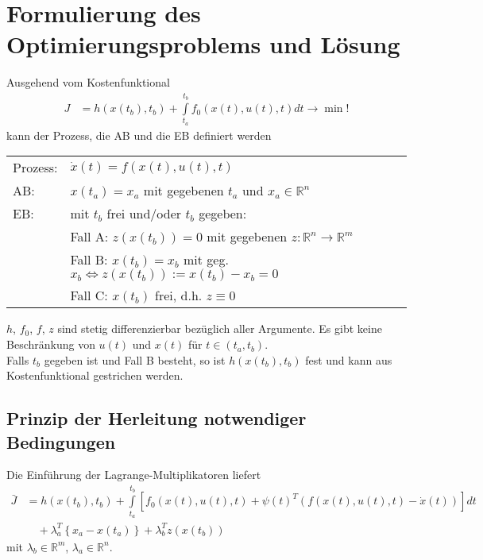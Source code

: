 \section{Formulierung des Optimierungsproblems und Lösung}
Ausgehend vom Kostenfunktional
\begin{align*}
	J & = h\left(x(t_b),t_b \right) + \int\limits_{t_a}^{t_b}f_0\left(x(t),u(t),t \right)dt\rightarrow \min!
\end{align*}
kann der Prozess, die \ac{AB} und die \ac{EB} definiert werden\\
\begin{tabular}{ll}
Prozess: & $\dot{x}(t)=f\left(x(t),u(t),t \right)$\\
\ac{AB}: & $x(t_a)=x_a$ mit gegebenen $t_a$ und $x_a\in\mathbb{R}^n$\\
\ac{EB}: & mit $t_b$ frei und/oder $t_b$ gegeben:\\
		 & Fall A: $z\left(x(t_b) \right)=0$ mit gegebenen $z:\mathbb{R}^n\rightarrow\mathbb{R}^m$\\
		 & Fall B: $x(t_b)=x_b$ mit geg. $x_b\Leftrightarrow z(x(t_b)):=x(t_b)-x_b=0$\\
		 & Fall C: $x(t_b)$ frei, d.h. $z\equiv 0$ 
\end{tabular}
$h$, $f_0$, $f$, $z$ sind stetig differenzierbar bezüglich aller Argumente. Es gibt keine Beschränkung von $u(t)$ und $x(t)$ für $t\in\left(t_a, t_b
\right)$.\\
Falls $t_b$ gegeben ist und Fall B besteht, so ist $h(x(t_b),t_b)$ fest und kann aus Kostenfunktional gestrichen werden.

\subsection{Prinzip der Herleitung notwendiger Bedingungen}
Die Einführung der Lagrange-Multiplikatoren liefert
\begin{align*}
	\bar{J} & = h\left(x(t_b),t_b \right)+\int\limits_{t_a}^{t_b}\left[f_0\left(x(t),u(t),t \right)+\psi(t)^T\left(f(x(t),u(t),t)-\dot{x}(t) \right)
	\right]dt\\
	& \quad + \lambda_a^T\left\{x_a - x(t_a) \right\} + \lambda_b^T z\left(x(t_b) \right)
\end{align*}
mit $\lambda_b\in\mathbb{R}^m$, $\lambda_a\in\mathbb{R}^n$.

